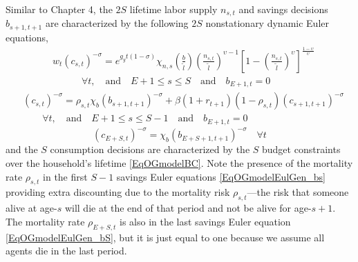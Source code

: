 \documentclass[letterpaper,12pt]{article}
\theoremstyle{definition}
\begin{document}
    Similar to Chapter 4, the $2S$ lifetime labor supply $n_{s,t}$ and savings decisions $b_{s+1,t+1}$ are characterized by the following $2S$ nonstationary dynamic Euler equations,
    \begin{equation}\label{EqOGmodelEulGen_n}
      \begin{split}
        &w_t\left(c_{s,t}\right)^{-\sigma} = e^{g_y t(1-\sigma)}\chi_{n,s}\left(\frac{b}{\tilde{l}}\right)\left(\frac{n_{s,t}}{\tilde{l}}\right)^{\upsilon - 1}\left[1 - \left(\frac{n_{s,t}}{\tilde{l}}\right)^\upsilon\right]^\frac{1-\upsilon}{\upsilon} \\
        &\qquad\quad\forall t,\quad\text{and}\quad E+1\leq s\leq S\quad\text{and}\quad b_{E+1,t} = 0
      \end{split}
    \end{equation}
    \begin{equation}\label{EqOGmodelEulGen_bs}
      \begin{split}
        &\left(c_{s,t}\right)^{-\sigma} = \rho_{s,t}\chi_b(b_{s+1,t+1})^{-\sigma} + \beta(1+r_{t+1})(1 - \rho_{s,t})\left(c_{s+1,t+1}\right)^{-\sigma} \\
        &\qquad\forall t,\quad\text{and}\quad E+1\leq s\leq S-1\quad\text{and}\quad b_{E+1,t} = 0
      \end{split}
    \end{equation}
    \begin{equation}\label{EqOGmodelEulGen_bS}
      \left(c_{E+S,t}\right)^{-\sigma} = \chi_b(b_{E+S+1,t+1})^{-\sigma} \quad\forall t
    \end{equation}
    and the $S$ consumption decisions are characterized by the $S$ budget constraints over the household's lifetime \eqref{EqOGmodelBC}. Note the presence of the mortality rate $\rho_{s,t}$ in the first $S-1$ savings Euler equations \eqref{EqOGmodelEulGen_bs} providing extra discounting due to the mortality risk $\rho_{s,t}$---the risk that someone alive at age-$s$ will die at the end of that period and not be alive for age-$s+1$. The mortality rate $\rho_{E+S,t}$ is also in the last savings Euler equation \eqref{EqOGmodelEulGen_bS}, but it is just equal to one because we assume all agents die in the last period.
\end{document}
